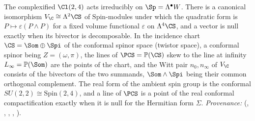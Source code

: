 The complexified $\Cl(2,4)$ acts irreducibly on $\Sp = \Lambda^{\bullet}W$. There is a canonical isomorphism $V_{\C} \cong \Lambda^{2}\CS$ of $\mathrm{Spin}$-modules under which the quadratic form is $P \mapsto \varepsilon(P \wedge P)$ for a fixed volume functional $\varepsilon$ on $\Lambda^{4}\CS$, and a vector is null exactly when its bivector is decomposable. In the incidence chart $\CS = \Som \oplus \Spi$ of the conformal spinor space (twistor space), a conformal spinor being $Z = (\omega, \pi)$, the lines of $\PCS = \mathbb{P}(\CS)$ skew to the line at infinity $L_{\infty} = \mathbb{P}(\Som)$ are the points of the chart, and the Witt pair $n_{0}, n_{\infty}$ of $V_{\C}$ consists of the bivectors of the two summands, $\Som \wedge \Spi$ being their common orthogonal complement. The real form of the ambient spin group is the conformal $SU(2,2) \cong \mathrm{Spin}(2,4)$, and a line of $\PCS$ is a point of the real conformal compactification exactly when it is null for the Hermitian form $\Sigma$. \emph{Provenance:} \cite[Rem.~3.2, Thms.~3.1, 3.4, 4.2, Props.~4.1, 4.5]{ButlerT9} (, , , , ).
